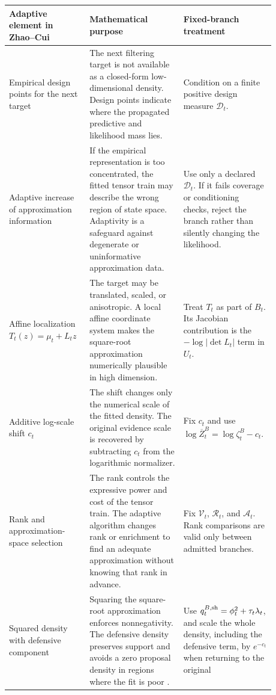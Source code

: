 \documentclass[11pt]{article}
\numberwithin{equation}{section}
\begin{document}
\begin{table}[htbp]
\centering
\small
\begin{tabular}{p{0.25\linewidth}p{0.33\linewidth}p{0.30\linewidth}}
\toprule
Adaptive element in Zhao--Cui & Mathematical purpose & Fixed-branch treatment\\
\midrule
Empirical design points for the next target &
The next filtering target is not available as a closed-form low-dimensional
density.  Design points indicate where the propagated predictive and likelihood
mass lies. &
Condition on a finite positive design measure \(\mathcal D_t\).\\
\addlinespace
Adaptive increase of approximation information &
If the empirical representation is too concentrated, the fitted tensor train may
describe the wrong region of state space.  Adaptivity is a safeguard against
degenerate or uninformative approximation data. &
Use only a declared \(\mathcal D_t\).  If it fails coverage or conditioning
checks, reject the branch rather than silently changing the likelihood.\\
\addlinespace
Affine localization \(T_t(z)=\mu_t+L_tz\) &
The target may be translated, scaled, or anisotropic.  A local affine coordinate
system makes the square-root approximation numerically plausible in high
dimension. &
Treat \(T_t\) as part of \(B_t\).  Its Jacobian contribution is the
\(-\log|\det L_t|\) term in \(U_t\).\\
\addlinespace
Additive log-scale shift \(c_t\) &
The shift changes only the numerical scale of the fitted density.  The original
evidence scale is recovered by subtracting \(c_t\) from the logarithmic
normalizer. &
Fix \(c_t\) and use
\(\log\overline Z_t^B=\log\zeta_t^B-c_t\).\\
\addlinespace
Rank and approximation-space selection &
The rank controls the expressive power and cost of the tensor train.  The
adaptive algorithm changes rank or enrichment to find an adequate approximation
without knowing that rank in advance. &
Fix \(\mathcal V_t\), \(\mathcal R_t\), and \(\mathcal A_t\).  Rank comparisons
are valid only between admitted branches.\\
\addlinespace
Squared density with defensive component &
Squaring the square-root approximation enforces nonnegativity.  The defensive
density preserves support and avoids a zero proposal density in regions where
the fit is poor \cite[Eq.~(13)]{zhao2024ttsequential}. &
Use \(q_t^{B,{\rm sh}}=\phi_t^2+\tau_t\lambda_t\), and scale the whole density,
including the defensive term, by \(e^{-c_t}\) when returning to the original

\end{tabular}
\end{table}
\end{document}
